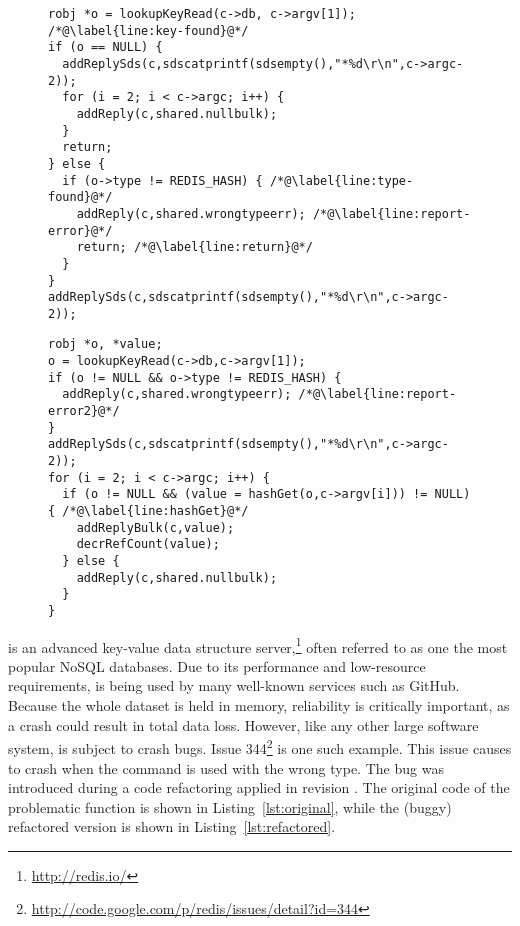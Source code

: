 \begin{figure}[t]
\begin{minipage}[b]{0.90\columnwidth}
\begin{lstlisting}[label=lst:original, caption={Original (correct) version of the {\footnotesize \texttt{hmgetCommand}} function in \redis.}]
robj *o = lookupKeyRead(c->db, c->argv[1]); /*@\label{line:key-found}@*/
if (o == NULL) {
  addReplySds(c,sdscatprintf(sdsempty(),"*%d\r\n",c->argc-2));
  for (i = 2; i < c->argc; i++) {
    addReply(c,shared.nullbulk);
  }
  return;
} else {
  if (o->type != REDIS_HASH) { /*@\label{line:type-found}@*/
    addReply(c,shared.wrongtypeerr); /*@\label{line:report-error}@*/
    return; /*@\label{line:return}@*/
  }
}
addReplySds(c,sdscatprintf(sdsempty(),"*%d\r\n",c->argc-2));
\end{lstlisting}
\end{minipage}
\hspace{2.2\columnsep}
\begin{minipage}[b]{0.9\columnwidth}
\begin{lstlisting}[label=lst:refactored, caption={Refactored (buggy) version of the {\footnotesize \texttt{hmgetCommand}} function in \redis.}]
robj *o, *value;
o = lookupKeyRead(c->db,c->argv[1]);
if (o != NULL && o->type != REDIS_HASH) {
  addReply(c,shared.wrongtypeerr); /*@\label{line:report-error2}@*/
}
addReplySds(c,sdscatprintf(sdsempty(),"*%d\r\n",c->argc-2));
for (i = 2; i < c->argc; i++) {
  if (o != NULL && (value = hashGet(o,c->argv[i])) != NULL) { /*@\label{line:hashGet}@*/
    addReplyBulk(c,value);
    decrRefCount(value);
  } else {
    addReply(c,shared.nullbulk);
  }
}
\end{lstlisting}
\end{minipage}
\end{figure}

\redis is an advanced key-value data structure
server,\footnote{\url{http://redis.io/}} often referred to as one the most
popular NoSQL databases.  Due to its performance and low-resource requirements,
\redis is being used by many well-known services such as GitHub.  Because the
whole dataset is held in memory, reliability is critically important, as a
crash could result in total data loss.  However, like any other large software
system, \redis is subject to crash bugs. Issue
344\footnote{\url{http://code.google.com/p/redis/issues/detail?id=344}} is one
such example.  This issue causes \redis to crash when the 
command is used with the wrong type.  The bug was introduced during a code
refactoring applied in revision .  The original code of the
problematic  function is shown in
Listing~\ref{lst:original}, while the (buggy) refactored version is shown in
Listing~\ref{lst:refactored}.

